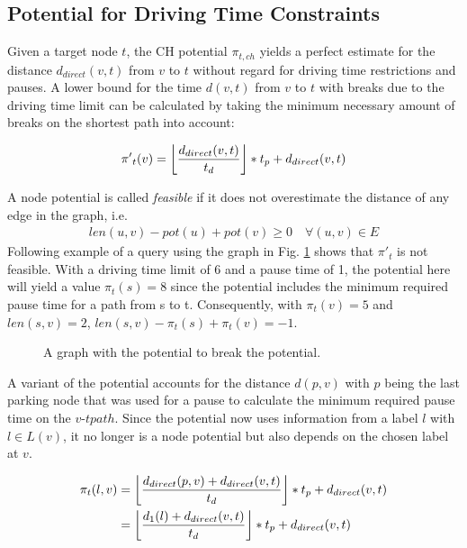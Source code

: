 \subsection{Potential for Driving Time Constraints}
Given a target node $t$, the CH potential $\pi_{t,ch}$ yields a perfect estimate for the distance $d_{direct}(v,t)$ from $v$ to $t$ without regard for driving time restrictions and pauses. A lower bound for the time $d(v,t)$ from $v$ to $t$ with breaks due to the driving time limit can be calculated by taking the minimum necessary amount of breaks on the shortest path into account:

\[\pi{'}_t(v) = \floor*{ \frac{d_{direct}(v,t)}{t_d} } * t_p + d_{direct}(v,t)\]

A node potential is called \emph{feasible} if it does not overestimate the distance of any edge in the graph, i.e.
\begin{align}
	\label{eq:node_potential_feasibility}
	len(u,v) - pot(u) + pot(v) \ge 0 \quad \forall (u,v) \in E
\end{align}
Following example of a query using the graph in Fig. \ref{fig:graph_infeasible_potential} shows that $\pi{'}_t$ is not feasible. With a driving time limit of 6 and a pause time of 1, the potential here will yield a value $\pi_t(s) = 8$ since the potential includes the minimum required pause time for a path from s to t. Consequently, with $\pi_t(v) = 5$ and $len(s,v) = 2$, $len(s,v) - \pi_t(s) + \pi_t(v) = -1$.

\begin{figure}[hbtp]
	\centering
	
	\caption{A graph with the potential to break the potential.}
	\label{fig:graph_infeasible_potential}
\end{figure}

A variant of the potential accounts for the distance $d(p,v)$ with $p$ being the last parking node that was used for a pause to calculate the minimum required pause time on the $v$-$t path$. Since the potential now uses information from a label $l$ with $l \in L(v)$, it no longer is a node potential but also depends on the chosen label at $v$.

\begin{align*}
	\pi_t(l,v) & = \floor*{ \frac{d_{direct}(p,v) + d_{direct}(v,t)}{t_d} } * t_p + d_{direct}(v,t) \\
	           & = \floor*{ \frac{d_1(l) + d_{direct}(v,t)}{t_d} } * t_p + d_{direct}(v,t)
\end{align*}

